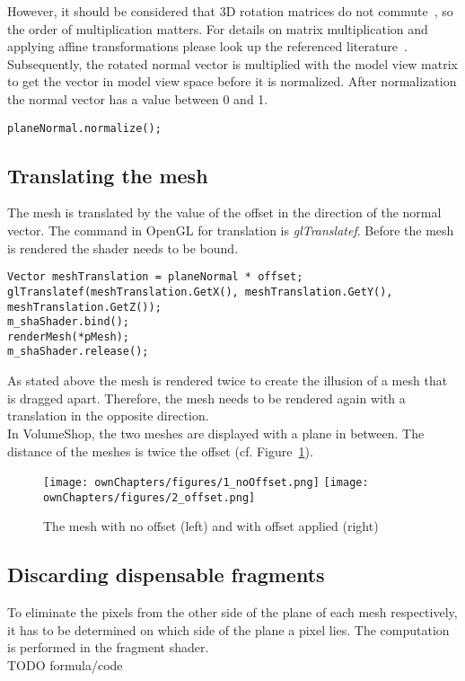 \newline
However, it should be considered that 3D rotation matrices do not commute~\cite{book:computerGraphicsHill}, so the order of multiplication matters. For details on matrix multiplication and applying affine transformations please look up the referenced literature~\cite{book:computerGraphicsHearn}\cite{book:computerGraphicsHill}.
\newline
Subsequently, the rotated normal vector is multiplied with the model view matrix to get the vector in model view space before it is normalized. After normalization the normal vector has a value between 0 and 1.
\begin{lstlisting}
planeNormal.normalize();
\end{lstlisting}

\subsection{Translating the mesh}
The mesh is translated by the value of the offset in the direction of the normal vector. The command in OpenGL for translation is \emph{glTranslatef}. Before the mesh is rendered the shader needs to be bound.
\begin{lstlisting}
Vector meshTranslation = planeNormal * offset;
glTranslatef(meshTranslation.GetX(), meshTranslation.GetY(), meshTranslation.GetZ());
m_shaShader.bind();
renderMesh(*pMesh);
m_shaShader.release();
\end{lstlisting}
As stated above the mesh is rendered twice to create the illusion of a mesh that is dragged apart. Therefore, the mesh needs to be rendered again with a translation in the opposite direction.\\
In VolumeShop, the two meshes are displayed with a plane in between. The distance of the meshes is twice the offset (cf. Figure~\ref{fig:offset}).
\begin{figure}%
\centering
\texttt{[image: ownChapters/figures/1\_noOffset.png]}%
\hspace{7.00mm}
\texttt{[image: ownChapters/figures/2\_offset.png]}%
\caption{The mesh with no offset (left) and with offset applied (right)}%
\label{fig:offset}%
\end{figure}

\subsection{Discarding dispensable fragments}
To eliminate the pixels from the other side of the plane of each mesh respectively, it has to be determined on which side of the plane a pixel lies. The computation is performed in the fragment shader.\\
TODO formula/code

